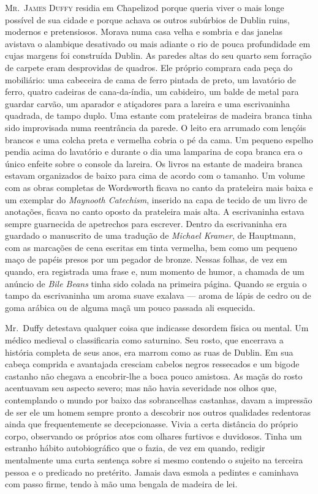 \textsc{Mr.~James Duffy} residia em Chapelizod porque queria viver o mais longe
possível de sua cidade e porque achava os outros subúrbios de Dublin ruins,
modernos e pretensiosos.  Morava numa casa velha e sombria e das janelas
avistava o alambique desativado ou mais adiante o rio de pouca profundidade em
cujas margens foi construída Dublin.  As paredes altas do seu quarto sem
forração de carpete eram desprovidas de quadros.  Ele próprio comprara cada
peça do mobiliário: uma cabeceira de cama de ferro pintada de preto, um
lavatório de ferro, quatro cadeiras de cana-da-índia, um cabideiro, um balde de
metal para guardar carvão, um aparador e atiçadores para a lareira e uma
escrivaninha quadrada, de tampo duplo.  Uma estante com prateleiras de madeira
branca tinha sido improvisada numa reentrância da parede.  O leito era arrumado
com lençóis brancos e uma colcha preta e vermelha cobria o pé da cama.  Um
pequeno espelho pendia acima do lavatório e durante o dia uma lamparina de copa
branca era o único enfeite sobre o console da lareira.  Os livros na estante de
madeira branca estavam organizados de baixo para cima de acordo com o tamanho.
Um volume com as obras completas de Wordsworth ficava no canto da prateleira
mais baixa e um exemplar do \textit{Maynooth Catechism}, inserido na capa de
tecido de um livro de anotações, ficava no canto oposto da prateleira mais
alta.  A escrivaninha estava sempre guarnecida de apetrechos para escrever.
Dentro da escrivaninha era guardado o manuscrito de uma tradução de
\textit{Michael Kramer}, de Hauptmann, com as marcações de cena escritas em
tinta vermelha, bem como um pequeno maço de papéis presos por um pegador de
bronze.  Nessas folhas, de vez em quando, era registrada uma frase e, num
momento de humor, a chamada de um anúncio de \textit{Bile Beans} tinha sido
colada na primeira página.  Quando se erguia o tampo da escrivaninha um aroma
suave exalava --- aroma de lápis de cedro ou de goma arábica ou de alguma
maçã um pouco passada ali esquecida.

Mr.~Duffy detestava qualquer coisa que indicasse desordem física ou mental.  Um
médico medieval o classificaria como saturnino.  Seu rosto, que encerrava a
história completa de seus anos, era marrom como as ruas de Dublin.  Em sua
cabeça comprida e avantajada cresciam cabelos negros ressecados e um bigode
castanho não chegava a encobrir-lhe a boca pouco amistosa.  As maçãs do rosto
acentuavam seu aspecto severo; mas não havia severidade nos olhos que,
contemplando o mundo por baixo das sobrancelhas castanhas, davam a impressão de
ser ele um homem sempre pronto a descobrir nos outros qualidades redentoras
ainda que frequentemente se decepcionasse.  Vivia a certa distância do próprio
corpo, observando os próprios atos com olhares furtivos e duvidosos.  Tinha um
estranho hábito autobiográfico que o fazia, de vez em quando, redigir
mentalmente uma curta sentença sobre si mesmo contendo o sujeito na terceira
pessoa e o predicado no pretérito.  Jamais dava esmola a pedintes e caminhava
com passo firme, tendo à mão uma bengala de madeira de lei.

